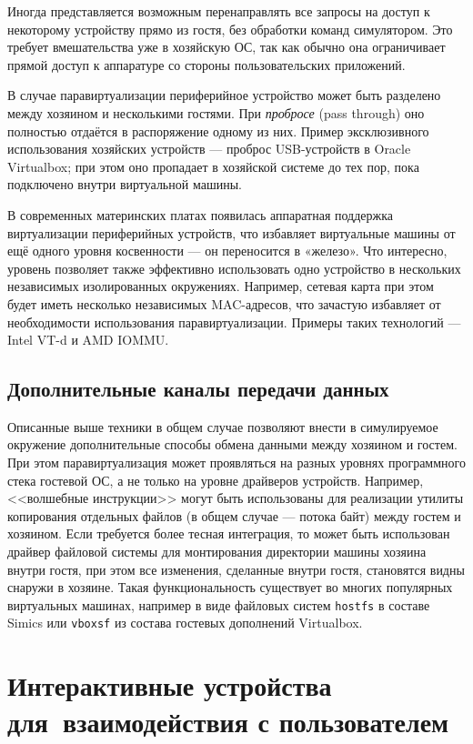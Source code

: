 Иногда представляется возможным перенаправлять все запросы на доступ к некоторому устройству прямо из гостя, без обработки команд симулятором. Это требует вмешательства уже в хозяйскую ОС, так как обычно она ограничивает  прямой доступ к аппаратуре со стороны пользовательских приложений.

В случае паравиртуализации периферийное устройство может быть разделено между хозяином и несколькими гостями. При \textit{пробросе} (\abbr pass through) оно полностью отдаётся в распоряжение одному из них. Пример эксклюзивного использования хозяйских устройств --- проброс USB-устройств в Oracle Virtualbox; при этом оно пропадает в хозяйской системе до тех пор, пока подключено внутри виртуальной машины.

В современных материнских платах появилась аппаратная поддержка виртуализации периферийных устройств, что избавляет виртуальные машины от ещё одного уровня косвенности --- он переносится в «железо». Что интересно, уровень позволяет также эффективно использовать одно устройство в нескольких независимых изолированных окружениях. Например, сетевая карта при этом будет иметь несколько независимых MAC-адресов, что зачастую избавляет от необходимости использования паравиртуализации. Примеры таких технологий --- Intel VT-d и AMD IOMMU.

\subsection{Дополнительные каналы передачи данных}

Описанные выше техники в общем случае позволяют внести в симулируемое окружение дополнительные способы обмена данными между хозяином и гостем. При этом паравиртуализация может проявляться на разных уровнях программного стека гостевой ОС, а не только на уровне драйверов устройств. Например, <<волшебные инструкции>> могут быть использованы для реализации утилиты копирования  отдельных файлов (в общем случае --- потока байт) между гостем и хозяином. Если требуется более тесная интеграция, то может быть использован драйвер файловой системы для монтирования директории машины хозяина внутри гостя, при этом все изменения, сделанные внутри гостя, становятся видны снаружи в хозяине. Такая функциональность существует во многих популярных виртуальных машинах, например в виде файловых систем \texttt{hostfs} в составе Simics или \texttt{vboxsf} из состава гостевых дополнений Virtualbox.

\section[Интерактивные устройства]{Интерактивные устройства для~взаимодействия с пользователем}

